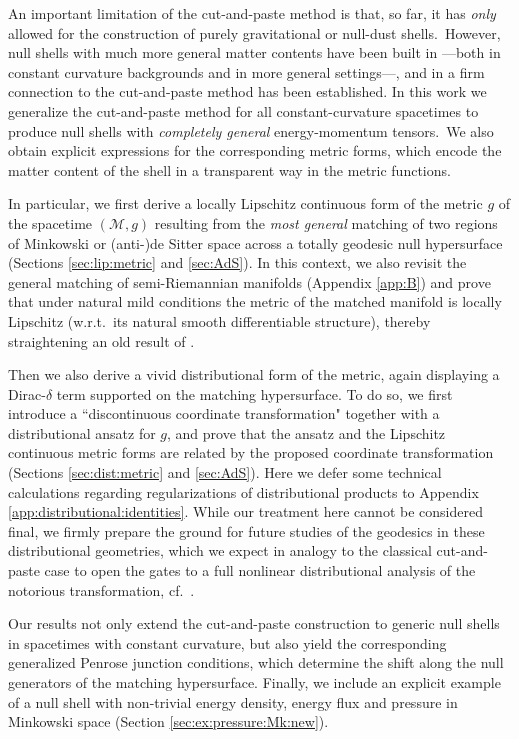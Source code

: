 \documentclass[11pt]{article}
\numberwithin{equation}{section}
\newcommand\M{\mathcal M}
\begin{document}
An important limitation of the cut-and-paste method is that, so far, it
has \textit{only} allowed for the construction of purely gravitational or null-dust shells.\  However, null shells with much more general matter contents have been built in \cite{manzano2021null,manzano2022general,manzano2023matching}---both in constant curvature backgrounds and in more general settings---, and in \cite{manzano2021null} a firm connection to the cut-and-paste method has been established. In this work we generalize the cut-and-paste method for all constant-curvature spacetimes to produce null shells with \textit{completely general} energy-momentum tensors.\ We also obtain explicit expressions for the corresponding metric forms, which encode the matter content of the shell in a transparent way in the metric functions.
\medskip

In particular, we first derive a locally Lipschitz continuous form of the metric $g$ of the spacetime $(\M,g)$ resulting from the \textit{most general} matching of two regions of Minkowski or (anti-)de Sitter space across a totally geodesic null hypersurface (Sections \ref{sec:lip:metric} and \ref{sec:AdS}). In this context, we also revisit the general matching of semi-Riemannian manifolds (Appendix \ref{app:B}) and prove that under 
natural mild conditions the metric of the matched manifold is locally Lipschitz (w.r.t.\ its natural smooth differentiable structure), thereby straightening an old result of \cite{clarke1987junction}. 
\medskip

Then we also derive a vivid distributional form of the metric, again displaying a Dirac-$\delta$ term supported on the matching hypersurface. To do so, we first introduce a ``discontinuous coordinate transformation" together with a distributional ansatz for $g$, and prove that the ansatz and the Lipschitz continuous metric forms are related by the proposed coordinate transformation (Sections \ref{sec:dist:metric} and \ref{sec:AdS}). Here we defer some technical calculations regarding regularizations of distributional products to Appendix \ref{app:distributional:identities}. While our treatment here cannot be considered final, we firmly prepare the ground for future studies of the geodesics in these distributional geometries, which we expect in analogy to the classical cut-and-paste case to open the gates to a full nonlinear distributional analysis of the notorious transformation, cf.\ \cite{ SSLP:16,SS:17,podolsky2019cut,samann2023cut}.
\medskip

Our results not only extend the cut-and-paste construction to generic null shells in spacetimes with constant curvature, but also yield the corresponding generalized Penrose junction conditions, which determine the shift along the null generators of the matching hypersurface. Finally, we include an explicit example of a null shell with non-trivial energy density, energy flux and pressure in Minkowski space (Section \ref{sec:ex:pressure:Mk:new}). 
\end{document}
